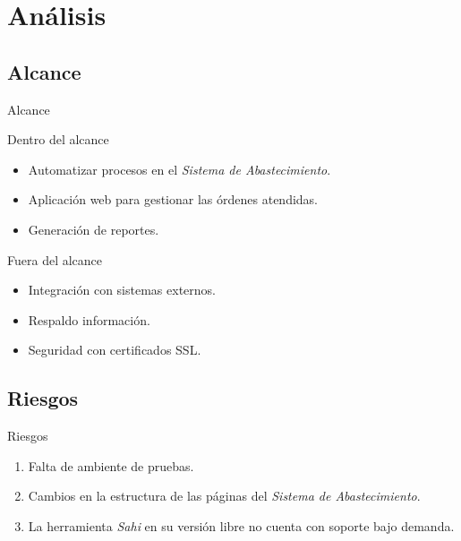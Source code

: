 \section{Análisis}
\subsection{Alcance}
	\begin{frame}{Alcance}
		\begin{block}{Dentro del alcance}
			\begin{itemize}
				\item Automatizar procesos en el \textit{Sistema de Abastecimiento}.
				\item Aplicación web para gestionar las órdenes atendidas.
				\item Generación de reportes.
			\end{itemize}
		\end{block}
		\begin{block}{Fuera del alcance}
			\begin{itemize}
				\item Integración con sistemas externos.
				\item Respaldo información.
				\item Seguridad con certificados SSL.
			\end{itemize}
		\end{block}
	\end{frame}

\subsection{Riesgos}
	\begin{frame}{Riesgos}
		\begin{enumerate}
			\item Falta de ambiente de pruebas.
			\item Cambios en la estructura de las páginas del \textit{Sistema de Abastecimiento}.
			\item La herramienta \textit{Sahi} en su versión libre no cuenta con soporte bajo demanda.
		\end{enumerate}
	\end{frame}

